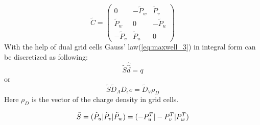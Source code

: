\begin{equation}
\tilde{C}=
	\begin{pmatrix}
	0&-\tilde{P}_{w}&\tilde{P}_{v}\\
	\tilde{P}_{w}&0&-\tilde{P}_{u}\\
	-\tilde{P}_{v}&\tilde{P}_{u}&0
	\end{pmatrix}
	\label{eq:dual_C_matrix}
\end{equation}
With the help of dual grid cells Gauss' law(\ref{eq:maxwell_3}) in integral form can be discretized\cite{script_FeldSim} as following:
\begin{equation}
\tilde{S}\widehat{\widehat{d}}=q
\label{eq:gausslaw}
\end{equation}
or
\begin{equation}
\tilde{S}\tilde{D}_{A}D_{\epsilon}e=\tilde{D}_{V}\rho_{D}
\label{eq:gausslaw_sample}
\end{equation}
Here $\rho_{D}$ is the vector of the charge density in grid cells.

\begin{equation}
\tilde{S}=(\tilde{P}_{u}|\tilde{P}_{v}|\tilde{P}_{w})=(-P_{u}^{T}|-P_{v}^{T}|\-P_{w}^{T})
\label{eq:dual_S_matrix}
\end{equation}
